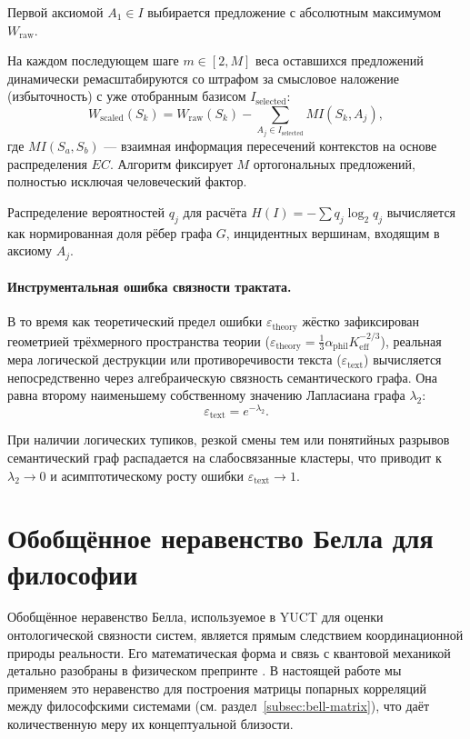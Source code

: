 \documentclass[12pt,a4paper]{article}
\begin{document}
	Первой аксиомой \(A_1 \in I\) выбирается предложение с абсолютным максимумом \(W_{\text{raw}}\).
	
	На каждом последующем шаге \(m \in [2, M]\) веса оставшихся предложений динамически ремасштабируются со штрафом за смысловое наложение (избыточность) с уже отобранным базисом \(I_{\text{selected}}\):
	\[
	W_{\text{scaled}}(S_{k}) = W_{\text{raw}}(S_{k}) - \sum_{A_{j} \in I_{\text{selected}}} MI(S_{k}, A_{j}),
	\]
	где \(MI(S_a, S_b)\) — взаимная информация пересечений контекстов на основе распределения \(EC\). Алгоритм фиксирует \(M\) ортогональных предложений, полностью исключая человеческий фактор.
	
	Распределение вероятностей \(q_{j}\) для расчёта \(H(I) = -\sum q_j \log_2 q_j\) вычисляется как нормированная доля рёбер графа \(G\), инцидентных вершинам, входящим в аксиому \(A_{j}\).
	
	\paragraph{Инструментальная ошибка связности трактата.}
	В то время как теоретический предел ошибки \(\varepsilon_{\text{theory}}\) жёстко зафиксирован геометрией трёхмерного пространства теории (\(\varepsilon_{\text{theory}} = \frac{1}{3} \alpha_{\text{phil}} K_{\text{eff}}^{-2/3}\)), реальная мера логической деструкции или противоречивости текста (\(\varepsilon_{\text{text}}\)) вычисляется непосредственно через алгебраическую связность семантического графа. Она равна второму наименьшему собственному значению Лапласиана графа \(\lambda_{2}\):
	\[
	\varepsilon_{\text{text}} = e^{-\lambda_{2}}.
	\]
	
	При наличии логических тупиков, резкой смены тем или понятийных разрывов семантический граф распадается на слабосвязанные кластеры, что приводит к \(\lambda_2 \to 0\) и асимптотическому росту ошибки \(\varepsilon_{\text{text}} \to 1\).
	
	\section{Обобщённое неравенство Белла для философии}
	
	Обобщённое неравенство Белла, используемое в YUCT для оценки онтологической связности систем, является прямым следствием координационной природы реальности. Его математическая форма и связь с квантовой механикой детально разобраны в физическом препринте \cite{Yakushev2026b}. В настоящей работе мы применяем это неравенство для построения матрицы попарных корреляций между философскими системами (см. раздел~\ref{subsec:bell-matrix}), что даёт количественную меру их концептуальной близости.
	
\end{document}
